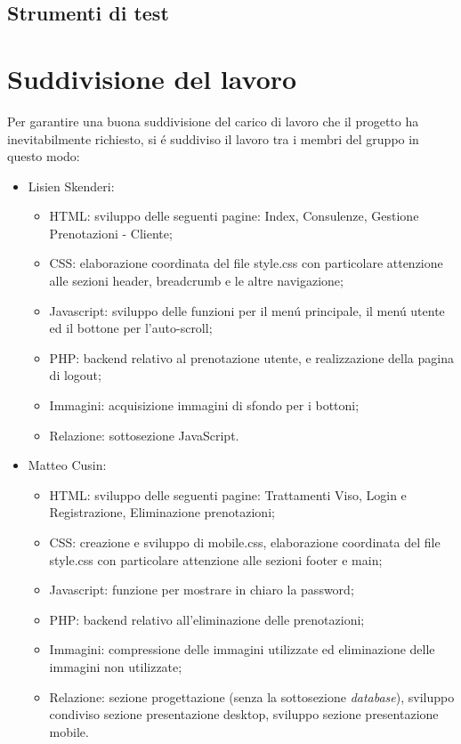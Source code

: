 \documentclass[]{article}
\begin{document}
\subsection{Strumenti di test}
\section{Suddivisione del lavoro}
Per garantire una buona suddivisione del carico di lavoro che il progetto ha inevitabilmente richiesto, si é suddiviso il lavoro tra i membri del gruppo in questo modo:
\begin{itemize}
	\item Lisien Skenderi: 
	\begin{itemize}
		\item HTML: sviluppo delle seguenti pagine: Index, Consulenze, Gestione Prenotazioni - Cliente;
		\item CSS:  elaborazione coordinata del file style.css con particolare attenzione alle sezioni header, breadcrumb e le altre navigazione;
		\item Javascript: sviluppo delle funzioni per il menú principale, il menú utente ed il bottone per l'auto-scroll;
		\item PHP: backend relativo al prenotazione utente, e realizzazione della pagina di logout;
		\item Immagini: acquisizione immagini di sfondo per i bottoni;
		\item Relazione: sottosezione JavaScript.
	\end{itemize}
	\item Matteo Cusin:
	\begin{itemize}
		\item HTML: sviluppo delle seguenti pagine: Trattamenti Viso, Login e Registrazione, Eliminazione prenotazioni;
		\item CSS: creazione e sviluppo di mobile.css, elaborazione coordinata del file style.css con particolare attenzione alle sezioni footer e main;
		\item Javascript: funzione per mostrare in chiaro la password;
		\item PHP: backend relativo all'eliminazione delle prenotazioni;
		\item Immagini: compressione delle immagini utilizzate ed eliminazione delle immagini non utilizzate;
		\item Relazione: sezione progettazione (senza la sottosezione \textit{database}), sviluppo condiviso sezione presentazione desktop, sviluppo sezione presentazione mobile.

\end{itemize}
\end{itemize}
\end{document}
